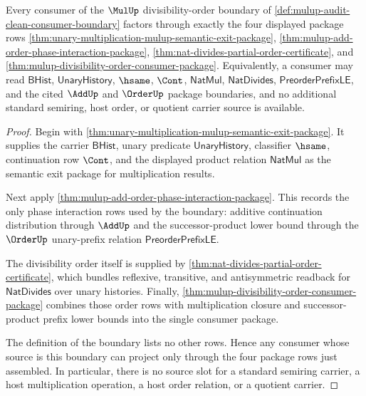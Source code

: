 \begin{theorem}
\label{thm:mulup-divisibility-order-source-exactness}
Every consumer of the $\MulUp$ divisibility-order boundary of
\autoref{def:mulup-audit-clean-consumer-boundary} factors through exactly the
four displayed package rows
\autoref{thm:unary-multiplication-mulup-semantic-exit-package},
\autoref{thm:mulup-add-order-phase-interaction-package},
\autoref{thm:nat-divides-partial-order-certificate}, and
\autoref{thm:mulup-divisibility-order-consumer-package}. Equivalently, a
consumer may read $\mathsf{BHist}$, $\mathsf{UnaryHistory}$, $\hsame$, $\Cont$,
$\mathsf{NatMul}$, $\mathsf{NatDivides}$, $\mathsf{PreorderPrefixLE}$, and the
cited $\AddUp$ and $\OrderUp$ package boundaries, and no additional standard
semiring, host order, or quotient carrier source is available.
\end{theorem}
\begin{proof}
Begin with \autoref{thm:unary-multiplication-mulup-semantic-exit-package}.
It supplies the carrier $\mathsf{BHist}$, unary predicate
$\mathsf{UnaryHistory}$, classifier $\hsame$, continuation row $\Cont$, and
the displayed product relation $\mathsf{NatMul}$ as the semantic exit package
for multiplication results.

Next apply \autoref{thm:mulup-add-order-phase-interaction-package}. This
records the only phase interaction rows used by the boundary: additive
continuation distribution through $\AddUp$ and the successor-product lower
bound through the $\OrderUp$ unary-prefix relation
$\mathsf{PreorderPrefixLE}$.

The divisibility order itself is supplied by
\autoref{thm:nat-divides-partial-order-certificate}, which bundles reflexive,
transitive, and antisymmetric readback for $\mathsf{NatDivides}$ over unary
histories. Finally,
\autoref{thm:mulup-divisibility-order-consumer-package} combines those order
rows with multiplication closure and successor-product prefix lower bounds into
the single consumer package.

The definition of the boundary lists no other rows. Hence any consumer whose
source is this boundary can project only through the four package rows just
assembled. In particular, there is no source slot for a standard semiring
carrier, a host multiplication operation, a host order relation, or a quotient
carrier.
\end{proof}


